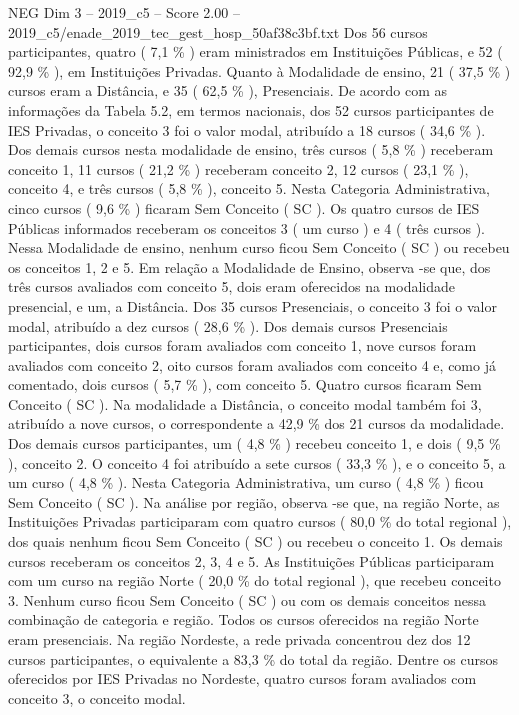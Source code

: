 \begin{textsample}{NEG Dim 3 – 2019\_c5 – Score 2.00 – 2019\_c5/enade\_2019\_tec\_gest\_hosp\_50af38c3bf.txt}
Dos 56 cursos participantes, quatro ( 7,1 \% ) eram ministrados em Instituições Públicas, e 52 ( 92,9 \% ), em Instituições Privadas.
Quanto à Modalidade de ensino, 21 ( 37,5 \% ) cursos eram a Distância, e 35 ( 62,5 \% ), Presenciais.
De acordo com as informações da Tabela 5.2, em termos nacionais, dos 52 cursos participantes de IES Privadas, o conceito 3 foi o valor modal, atribuído a 18 cursos ( 34,6 \% ).
Dos demais cursos nesta modalidade de ensino, três cursos ( 5,8 \% ) receberam conceito 1, 11 cursos ( 21,2 \% ) receberam conceito 2, 12 cursos ( 23,1 \% ), conceito 4, e três cursos ( 5,8 \% ), conceito 5.
Nesta Categoria Administrativa, cinco cursos ( 9,6 \% ) ficaram Sem Conceito ( SC ).
Os quatro cursos de IES Públicas informados receberam os conceitos 3 ( um curso ) e 4 ( três cursos ).
Nessa Modalidade de ensino, nenhum curso ficou Sem Conceito ( SC ) ou recebeu os conceitos 1, 2 e 5.
Em relação a Modalidade de Ensino, observa -se que, dos três cursos avaliados com conceito 5, dois eram oferecidos na modalidade presencial, e um, a Distância.
Dos 35 cursos Presenciais, o conceito 3 foi o valor modal, atribuído a dez cursos ( 28,6 \% ).
Dos demais cursos Presenciais participantes, dois cursos foram avaliados com conceito 1, nove cursos foram avaliados com conceito 2, oito cursos foram avaliados com conceito 4 e, como já comentado, dois cursos ( 5,7 \% ), com conceito 5.
Quatro cursos ficaram Sem Conceito ( SC ).
Na modalidade a Distância, o conceito modal também foi 3, atribuído a nove cursos, o correspondente a 42,9 \% dos 21 cursos da modalidade.
Dos demais cursos participantes, um ( 4,8 \% ) recebeu conceito 1, e dois ( 9,5 \% ), conceito 2.
O conceito 4 foi atribuído a sete cursos ( 33,3 \% ), e o conceito 5, a um curso ( 4,8 \% ).
Nesta Categoria Administrativa, um curso ( 4,8 \% ) ficou Sem Conceito ( SC ).
Na análise por região, observa -se que, na região Norte, as Instituições Privadas participaram com quatro cursos ( 80,0 \% do total regional ), dos quais nenhum ficou Sem Conceito ( SC ) ou recebeu o conceito 1.
Os demais cursos receberam os conceitos 2, 3, 4 e 5.
As Instituições Públicas participaram com um curso na região Norte ( 20,0 \% do total regional ), que recebeu conceito 3.
Nenhum curso ficou Sem Conceito ( SC ) ou com os demais conceitos nessa combinação de categoria e região.
Todos os cursos oferecidos na região Norte eram presenciais.
Na região Nordeste, a rede privada concentrou dez dos 12 cursos participantes, o equivalente a 83,3 \% do total da região.
Dentre os cursos oferecidos por IES Privadas no Nordeste, quatro cursos foram avaliados com conceito 3, o conceito modal.

\end{textsample}
